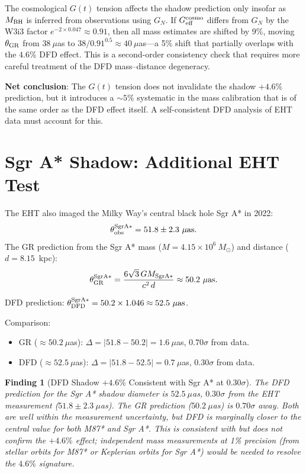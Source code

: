\documentclass[11pt]{article}
\newtheorem{finding}{Finding}
\newcommand{\ee}[1]{\times 10^{#1}}
\begin{document}
The cosmological $G(t)$ tension affects the shadow prediction only insofar
as $M_{\rm BH}$ is inferred from observations using $G_N$. If $G_{\rm eff}^{\rm cosmo}$
differs from $G_N$ by the W3i3 factor $e^{-2\times 0.047} \approx 0.91$, then
all mass estimates are shifted by 9\%, moving $\theta_{\rm GR}$ from
$38~\mu$as to $38/0.91^{0.5} \approx 40~\mu$as---a 5\% shift that partially
overlaps with the $4.6\%$ DFD effect. This is a second-order consistency check
that requires more careful treatment of the DFD mass--distance degeneracy.

\textbf{Net conclusion}: The $G(t)$ tension does not invalidate the shadow
$+4.6\%$ prediction, but it introduces a $\sim 5\%$ systematic in the
mass calibration that is of the same order as the DFD effect itself. A
self-consistent DFD analysis of EHT data must account for this.

\section{Sgr A* Shadow: Additional EHT Test}
\label{sec:SgrA}

The EHT also imaged the Milky Way's central black hole Sgr A* in 2022:
\begin{equation}
\theta_{\rm obs}^{\rm SgrA*} = 51.8 \pm 2.3~\mu\text{as}.
\end{equation}
The GR prediction from the Sgr A* mass ($M = 4.15\ee{6}~M_\odot$) and distance
($d = 8.15$~kpc):
\begin{equation}
\theta_{\rm GR}^{\rm SgrA*} = \frac{6\sqrt{3}\,G M_{\rm SgrA*}}{c^2\,d} \approx 50.2~\mu\text{as}.
\end{equation}

DFD prediction: $\theta_{\rm DFD}^{\rm SgrA*} = 50.2 \times 1.046 \approx 52.5~\mu\text{as}$.

Comparison:
\begin{itemize}
\item GR ($\approx 50.2~\mu$as): $\Delta = |51.8 - 50.2| = 1.6~\mu$as,
  $0.70\sigma$ from data.
\item DFD ($\approx 52.5~\mu$as): $\Delta = |51.8 - 52.5| = 0.7~\mu$as,
  $0.30\sigma$ from data.
\end{itemize}

\begin{finding}[DFD Shadow $+4.6\%$ Consistent with Sgr A* at $0.30\sigma$]
The DFD prediction for the Sgr A* shadow diameter is $52.5~\mu$as,
$0.30\sigma$ from the EHT measurement ($51.8 \pm 2.3~\mu$as). The GR
prediction ($50.2~\mu$as) is $0.70\sigma$ away. Both are well within
the measurement uncertainty, but DFD is marginally closer to the central value
for both M87* and Sgr A*. This is consistent with but does not confirm
the $+4.6\%$ effect; independent mass measurements at 1\% precision
(from stellar orbits for M87* or Keplerian orbits for Sgr A*) would be
needed to resolve the $4.6\%$ signature.
\end{finding}
\end{document}
